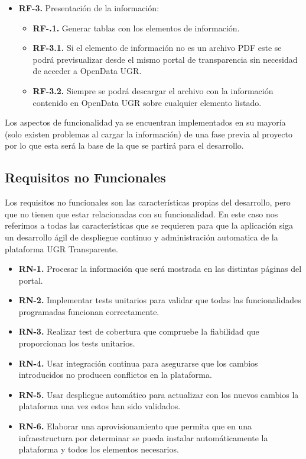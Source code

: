 \newpage
\begin{itemize}
  \item \textbf{RF-3.} Presentación de la información:
  \begin{itemize}
    \item \textbf{RF-.1.} Generar tablas con los elementos de información.
    \item \textbf{RF-3.1.} Si el elemento de información no es un archivo PDF este se podrá previsualizar desde el mismo portal
    de transparencia sin necesidad de acceder a OpenData UGR.
    \item \textbf{RF-3.2.} Siempre se podrá descargar el archivo con la información contenido en OpenData UGR sobre cualquier 
    elemento listado.
  \end{itemize}
\end{itemize}
	
Los aspectos de funcionalidad ya se encuentran implementados en su mayoría (solo existen problemas al cargar la información) de
una fase previa al proyecto por lo que esta será la base de la que se partirá para el desarrollo.

\subsection{Requisitos no Funcionales}

Los requisitos no funcionales son las características propias del desarrollo, pero que no tienen que estar relacionadas con su 
funcionalidad. En este caso nos referimos a todas las características que se requieren para que la aplicación siga un 
desarrollo ágil de despliegue continuo y administración automatica de la plataforma UGR Transparente.

\begin{itemize}
  \item \textbf{RN-1.} Procesar la información que será mostrada en las distintas páginas del portal.
  \item \textbf{RN-2.} Implementar tests unitarios para validar que todas las funcionalidades programadas funcionan 
  correctamente.
  \item \textbf{RN-3.} Realizar test de cobertura que compruebe la fiabilidad que proporcionan los tests unitarios.
  \item \textbf{RN-4.} Usar integración continua para asegurarse que los cambios introducidos no producen conflictos en la 
  plataforma.
  \item \textbf{RN-5.} Usar despliegue automático para actualizar con los nuevos cambios la plataforma una vez estos han sido 
  validados.
  \item \textbf{RN-6.} Elaborar una aprovisionamiento que permita que en una infraestructura por determinar se pueda instalar 
  automáticamente la plataforma y todos los elementos necesarios.
\end{itemize}

